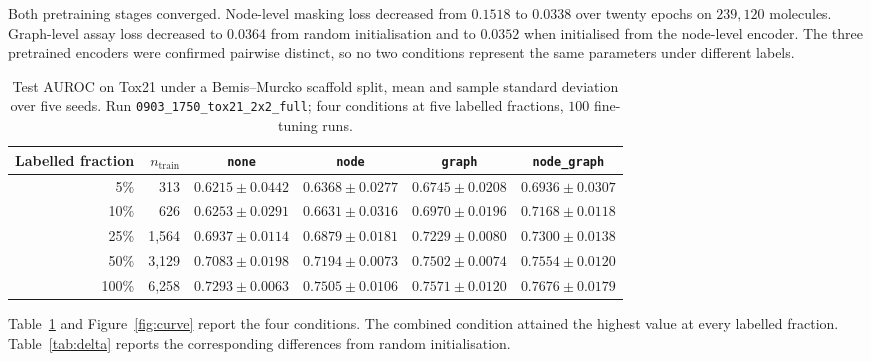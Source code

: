 \documentclass[11pt,a4paper]{article}
\begin{document}
Both pretraining stages converged. Node-level masking loss decreased from
$0.1518$ to $0.0338$ over twenty epochs on $239{,}120$ molecules. Graph-level
assay loss decreased to $0.0364$ from random initialisation and to $0.0352$ when
initialised from the node-level encoder. The three pretrained encoders were
confirmed pairwise distinct, so no two conditions represent the same parameters
under different labels.

\begin{table}[htbp]
\centering
\small
\caption{Test AUROC on Tox21 under a Bemis--Murcko scaffold split, mean and
sample standard deviation over five seeds. Run \texttt{0903\_1750\_tox21\_2x2\_full};
four conditions at five labelled fractions, $100$ fine-tuning runs.}
\label{tab:main}
\begin{tabular}{rrcccc}
\toprule
Labelled fraction & $n_{\mathrm{train}}$ & \texttt{none} & \texttt{node} & \texttt{graph} & \texttt{node\_graph} \\
\midrule
5\%   & 313  & $0.6215 \pm 0.0442$ & $0.6368 \pm 0.0277$ & $0.6745 \pm 0.0208$ & $0.6936 \pm 0.0307$ \\
10\%  & 626  & $0.6253 \pm 0.0291$ & $0.6631 \pm 0.0316$ & $0.6970 \pm 0.0196$ & $0.7168 \pm 0.0118$ \\
25\%  & 1,564 & $0.6937 \pm 0.0114$ & $0.6879 \pm 0.0181$ & $0.7229 \pm 0.0080$ & $0.7300 \pm 0.0138$ \\
50\%  & 3,129 & $0.7083 \pm 0.0198$ & $0.7194 \pm 0.0073$ & $0.7502 \pm 0.0074$ & $0.7554 \pm 0.0120$ \\
100\% & 6,258 & $0.7293 \pm 0.0063$ & $0.7505 \pm 0.0106$ & $0.7571 \pm 0.0120$ & $0.7676 \pm 0.0179$ \\
\bottomrule
\end{tabular}
\end{table}

Table~\ref{tab:main} and Figure~\ref{fig:curve} report the four conditions. The
combined condition attained the highest value at every labelled fraction.
Table~\ref{tab:delta} reports the corresponding differences from random
initialisation.
\end{document}
